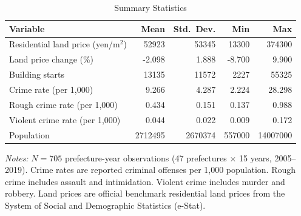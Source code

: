 \begin{table}[H]
\centering
\caption{Summary Statistics}
\label{tab:summary}
\begin{threeparttable}
\begin{tabular}{lrrrr}
\toprule
Variable & Mean & Std.\ Dev. & Min & Max \\
\midrule
Residential land price (yen/m$^2$) & 52923 & 53345 & 13300 & 374300 \\
Land price change (\%) & -2.098 & 1.888 & -8.700 & 9.900 \\
Building starts & 13135 & 11572 & 2227 & 55325 \\
Crime rate (per 1,000) & 9.266 & 4.287 & 2.224 & 28.298 \\
Rough crime rate (per 1,000) & 0.434 & 0.151 & 0.137 & 0.988 \\
Violent crime rate (per 1,000) & 0.044 & 0.022 & 0.009 & 0.172 \\
Population & 2712495 & 2670374 & 557000 & 14007000 \\
\bottomrule
\end{tabular}
\begin{tablenotes}[flushleft]
\small
\item \textit{Notes:} $N = 705$ prefecture-year observations (47 prefectures $\times$ 15 years, 2005--2019). Crime rates are reported criminal offenses per 1,000 population. Rough crime includes assault and intimidation. Violent crime includes murder and robbery. Land prices are official benchmark residential land prices from the System of Social and Demographic Statistics (e-Stat).
\end{tablenotes}
\end{threeparttable}
\end{table}

